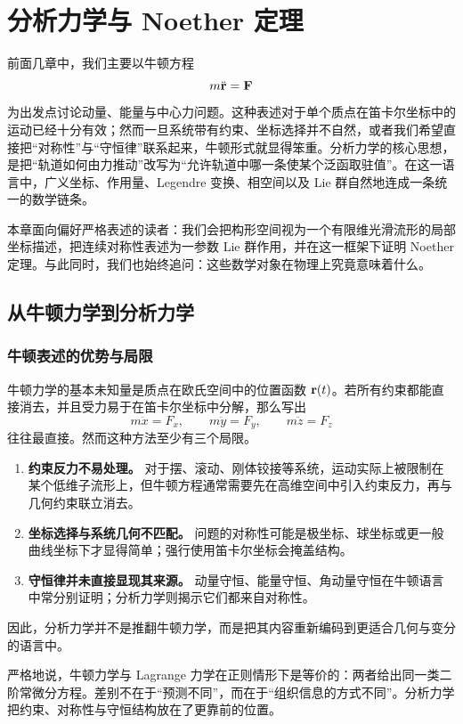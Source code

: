 \chapter{分析力学与 Noether 定理}
\label{chap:lagrangian-noether}

前面几章中，我们主要以牛顿方程
\[
  m\ddot{\vb r}=\vb F
\]
为出发点讨论动量、能量与中心力问题。这种表述对于单个质点在笛卡尔坐标中的运动已经十分有效；然而一旦系统带有约束、坐标选择并不自然，或者我们希望直接把“对称性”与“守恒律”联系起来，牛顿形式就显得笨重。分析力学的核心思想，是把“轨道如何由力推动”改写为“允许轨道中哪一条使某个泛函取驻值”。在这一语言中，广义坐标、作用量、Legendre 变换、相空间以及 Lie 群自然地连成一条统一的数学链条。

本章面向偏好严格表述的读者：我们会把构形空间视为一个有限维光滑流形的局部坐标描述，把连续对称性表述为一参数 Lie 群作用，并在这一框架下证明 Noether 定理。与此同时，我们也始终追问：这些数学对象在物理上究竟意味着什么。

\section{从牛顿力学到分析力学}

\subsection{牛顿表述的优势与局限}

牛顿力学的基本未知量是质点在欧氏空间中的位置函数 $\vb r(t)$。若所有约束都能直接消去，并且受力易于在笛卡尔坐标中分解，那么写出
\[
  m\ddot x = F_x,\qquad m\ddot y = F_y,\qquad m\ddot z = F_z
\]
往往最直接。然而这种方法至少有三个局限。

\begin{enumerate}
  \item \textbf{约束反力不易处理。} 对于摆、滚动、刚体铰接等系统，运动实际上被限制在某个低维子流形上，但牛顿方程通常需要先在高维空间中引入约束反力，再与几何约束联立消去。
  \item \textbf{坐标选择与系统几何不匹配。} 问题的对称性可能是极坐标、球坐标或更一般曲线坐标下才显得简单；强行使用笛卡尔坐标会掩盖结构。
  \item \textbf{守恒律并未直接显现其来源。} 动量守恒、能量守恒、角动量守恒在牛顿语言中常分别证明；分析力学则揭示它们都来自对称性。
\end{enumerate}

因此，分析力学并不是推翻牛顿力学，而是把其内容重新编码到更适合几何与变分的语言中。

\begin{remark}
严格地说，牛顿力学与 Lagrange 力学在正则情形下是等价的：两者给出同一类二阶常微分方程。差别不在于“预测不同”，而在于“组织信息的方式不同”。分析力学把约束、对称性与守恒结构放在了更靠前的位置。
\end{remark}

